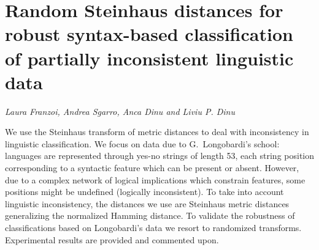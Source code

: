 \documentclass[../booklet.tex]{subfiles}
\begin{document}
\section[Random Steinhaus distances for robust syntax-based classification of partially inconsistent linguistic data. {\it Laura Franzoi, Andrea Sgarro, Anca Dinu and Liviu P. Dinu}]{Random Steinhaus distances for robust syntax-based classification of partially inconsistent linguistic data}
   

\begin{center}
  {\it Laura Franzoi, Andrea Sgarro, Anca Dinu and Liviu P. Dinu}
\end{center}

\vskip 0.8cm


We use the Steinhaus transform of metric distances to deal with inconsistency in linguistic classification.  We focus on data due to G.\ Longobardi's school: languages are represented through yes-no strings of length 53, each string position corresponding to a syntactic feature which can be present or absent. However, due to a complex network of logical implications which constrain features, some positions might be undefined (logically inconsistent). To take into account linguistic inconsistency, the distances we use are Steinhaus metric distances generalizing the normalized Hamming distance. To validate the robustness of classifications based on Longobardi's data we resort to randomized transforms. Experimental results are provided and commented upon.
\end{document}
